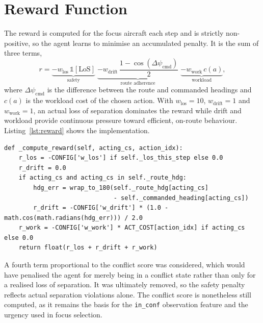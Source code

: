 \section{Reward Function}
\label{sec:method_reward}

The reward is computed for the focus aircraft each step and is strictly non-positive, so the agent learns to minimise an accumulated penalty. It is the sum of three terms,
\begin{equation}
\label{eq:reward}
r = \underbrace{- w_{\text{los}} \, \mathbb{1}[\text{LoS}]}_{\text{safety}}
    \; \underbrace{- w_{\text{drift}} \, \frac{1 - \cos(\Delta\psi_{\text{cmd}})}{2}}_{\text{route adherence}}
    \; \underbrace{- w_{\text{work}} \, c(a)}_{\text{workload}},
\end{equation}
where $\Delta\psi_{\text{cmd}}$ is the difference between the route and commanded headings and $c(a)$ is the workload cost of the chosen action. With $w_{\text{los}}=10$, $w_{\text{drift}}=1$ and $w_{\text{work}}=1$, an actual loss of separation dominates the reward while drift and workload provide continuous pressure toward efficient, on-route behaviour. Listing~\ref{lst:reward} shows the implementation.

\begin{lstlisting}[caption={The reward (\texttt{env.py}).}, label={lst:reward}]
def _compute_reward(self, acting_cs, action_idx):
    r_los = -CONFIG['w_los'] if self._los_this_step else 0.0
    r_drift = 0.0
    if acting_cs and acting_cs in self._route_hdg:
        hdg_err = wrap_to_180(self._route_hdg[acting_cs]
                              - self._commanded_heading[acting_cs])
        r_drift = -CONFIG['w_drift'] * (1.0 - math.cos(math.radians(hdg_err))) / 2.0
    r_work = -CONFIG['w_work'] * ACT_COST[action_idx] if acting_cs else 0.0
    return float(r_los + r_drift + r_work)
\end{lstlisting}

A fourth term proportional to the conflict score was considered, which would have penalised the agent for merely being in a conflict state rather than only for a realised loss of separation. It was ultimately removed, so the safety penalty reflects actual separation violations alone. The conflict score is nonetheless still computed, as it remains the basis for the \texttt{in\_conf} observation feature and the urgency used in focus selection.


